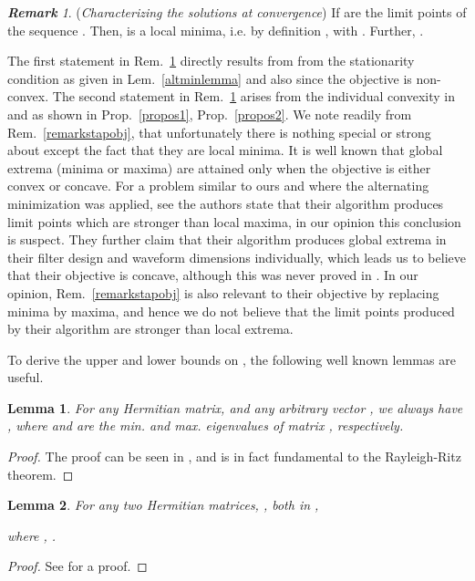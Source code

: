 \documentclass[11pt,draftclsnofoot,onecolumn]{IEEEtran}
\newtheorem{lem}{\bf {Lemma}}
\theoremstyle{definition}
\theoremstyle{remark}
\newtheorem{remk}{\bf Remark}
\begin{document}
\begin{remk} \label{limitpointremk} ({\it Characterizing the solutions at convergence})
If  are the limit points of the sequence . Then,  is a local minima, i.e. by definition , with . Further, .
\end{remk}

The first statement in Rem.~\ref{limitpointremk} directly results from  from the stationarity condition as  given  in Lem.~\ref{altminlemma} and also since the objective is non-convex. The second statement in Rem.~\ref{limitpointremk} arises from the individual convexity in  and  as shown in Prop.~\ref{propos1}, Prop.~\ref{propos2}. We note readily from Rem.~\ref{remarkstapobj}, that unfortunately there is nothing special or strong about  except the fact that they are local minima. It is well known that global extrema (minima or maxima) are attained only when the objective is either convex or concave. For a problem similar to ours and where the alternating minimization was applied, see \cite[pg.3537]{vaidyanathan2009} the authors state that their algorithm produces limit points which are stronger than local maxima, in our opinion this conclusion is suspect. They further claim that their algorithm produces global extrema in their filter design and waveform dimensions individually, which leads us to believe that their objective is concave, although this was never proved in \cite{vaidyanathan2009}. In our opinion, Rem.~\ref{remarkstapobj} is also relevant to their objective by replacing minima by maxima, and hence  we do not believe that the limit points produced by their algorithm are stronger than local extrema. 

To derive the upper and lower bounds on , the following well known lemmas are useful.
\begin{lem}\label{lemma2}
For any Hermitian matrix,  and any arbitrary vector  , we always have , where  and  are the min. and max. eigenvalues of matrix , respectively.
\end{lem}
\begin{proof}
The proof can be seen in \cite{horn1994}, and is in fact fundamental to the Rayleigh-Ritz theorem.
\end{proof}
\begin{lem}\label{lemma3}
For any two Hermitian matrices, , both in ,

where , .
\end{lem}
\begin{proof}
See \cite[Lemma. II. I]{Lasserre1995} for a proof.
\end{proof}
\end{document}
